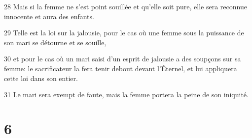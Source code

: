 \par 28 Mais si la femme ne s'est point souillée et qu'elle soit pure, elle sera reconnue innocente et aura des enfants.
\par 29 Telle est la loi sur la jalousie, pour le cas où une femme sous la puissance de son mari se détourne et se souille,
\par 30 et pour le cas où un mari saisi d'un esprit de jalousie a des soupçons sur sa femme: le sacrificateur la fera tenir debout devant l'Éternel, et lui appliquera cette loi dans son entier.
\par 31 Le mari sera exempt de faute, mais la femme portera la peine de son iniquité.

\chapter{6}

